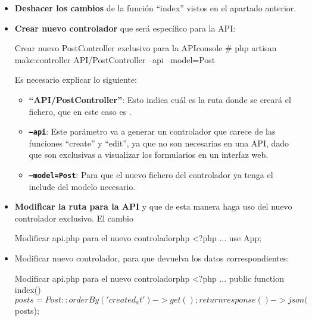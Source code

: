 \begin{itemize}
    \item \textbf{Deshacer los cambios} de la función “index” vistos en el apartado anterior.
    \item \textbf{Crear nuevo controlador} que será específico para la API:

\begin{mycode}{Crear nuevo PostController exclusivo para la API}{console}{{\small}}
# php artisan make:controller API/PostController --api --model=Post
\end{mycode}

    Es necesario explicar lo siguiente:
    \begin{itemize}
        \item \textbf{“API/PostController”}: Esto indica cuál es la ruta donde se creará el fichero, que en este caso es .

       \item \textbf{\texttt{--api}}: Este parámetro va a generar un controlador que carece de las funciones “create” y “edit”, ya que no son necesarias en una API, dado que son exclusivas a visualizar los formularios en un interfaz web.

       \item \textbf{\texttt{--model=Post}}: Para que el nuevo fichero del controlador ya tenga el include del modelo necesario.
    \end{itemize}

    \item \textbf{Modificar la ruta para la API} y que de esta manera haga uso del nuevo controlador exclusivo. El cambio

\begin{mycode}{Modificar api.php para el nuevo controlador}{php}{}
<?php
...
use App\Http\Controllers\API\PostController;
\end{mycode}

    \item Modificar nuevo controlador, para que devuelva los datos correspondientes:

\begin{mycode}{Modificar api.php para el nuevo controlador}{php}{}
<?php
...
public function index(){
    $posts = Post::orderBy('created_at')->get();
    return response()->json($posts);
}
\end{mycode}

\end{itemize}


